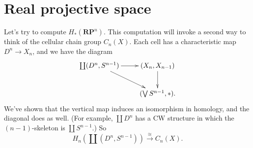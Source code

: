 \section{Real projective space}


Let's try to compute $H_\ast(\mathbf{RP}^n)$. This computation will invoke a 
second way to think of the cellular chain group $C_n(X)$. Each cell has a 
characteristic map $D^n\to X_n$, and we have the diagram
\[
\xymatrix{
\coprod(D^n,S^{n-1}) \ar[r] \ar[dr] & (X_n,X_{n-1}) \ar[d] \\
& (\bigvee S^{n-1},\ast).
}\]
We've shown that the vertical map induces an isomorphism in homology, and
the diagonal does as well. (For example, $\coprod D^n$ has a CW structure 
in which the $(n-1)$-skeleton is $\coprod S^{n-1}$.) So 
\[
H_n(\textstyle{\coprod}(D^n,S^{n-1}))\xrightarrow{\cong}C_n(X).
\]
 
